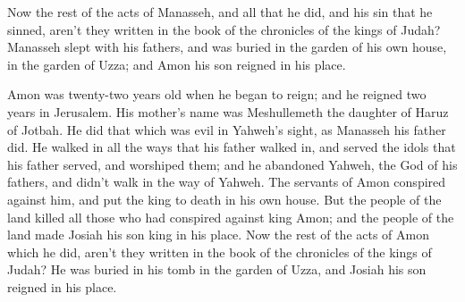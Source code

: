 {Now the rest of the acts of Manasseh, and all that he did, and his sin that he sinned, aren’t they written in the book of the chronicles of the kings of Judah?
Manasseh slept with his fathers, and was buried in the garden of his own house, in the garden of Uzza; and Amon his son reigned in his place.
\par }{\PP {}Amon was twenty-two years old when he began to reign; and he reigned two years in Jerusalem. His mother’s name was Meshullemeth the daughter of Haruz of Jotbah.
He did that which was evil in Yahweh’s sight, as Manasseh his father did.
He walked in all the ways that his father walked in, and served the idols that his father served, and worshiped them;
and he abandoned Yahweh, the God of his fathers, and didn’t walk in the way of Yahweh.
The servants of Amon conspired against him, and put the king to death in his own house.
But the people of the land killed all those who had conspired against king Amon; and the people of the land made Josiah his son king in his place.
Now the rest of the acts of Amon which he did, aren’t they written in the book of the chronicles of the kings of Judah?
He was buried in his tomb in the garden of Uzza, and Josiah his son reigned in his place.

}
